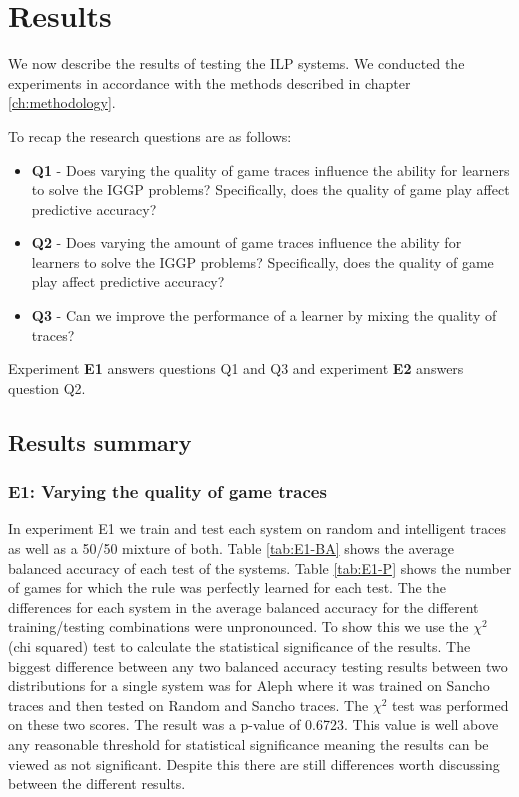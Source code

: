 \chapter{Results}\label{ch:results}
We now describe the results of testing the ILP systems. We conducted the experiments in accordance with the methods described in chapter \ref{ch:methodology}.

To recap the research questions are as follows:
\begin{itemize}
	\item \textbf{Q1} - Does varying the quality of game traces influence the ability for learners to solve the IGGP problems? Specifically, does the quality of game play affect predictive accuracy?
	\item \textbf{Q2} - Does varying the amount of game traces influence the ability for learners to solve the IGGP problems? Specifically, does the quality of game play affect predictive accuracy?
	\item \textbf{Q3} - Can we improve the performance of a learner by mixing the quality of traces?
\end{itemize}

Experiment \textbf{E1} answers questions Q1 and Q3 and experiment \textbf{E2} answers question Q2.

\section{Results summary}



\subsection{E1: Varying the quality of game traces}
In experiment E1 we train and test each system on random and intelligent traces as well as a 50/50 mixture of both. Table \ref{tab:E1-BA} shows the average balanced accuracy of each test of the systems. Table \ref{tab:E1-P} shows the number of games for which the rule was perfectly learned for each test. The the differences for each system in the average balanced accuracy for the different training/testing combinations were unpronounced. To show this we use the $\chi^2$ (chi squared) test to calculate the statistical significance of the results. The biggest difference between any two balanced accuracy testing results between two distributions for a single system was for Aleph where it was trained on Sancho traces and then tested on Random and Sancho traces. The $\chi^2$ test was performed on these two scores. The result was a p-value of 0.6723. This value is well above any reasonable threshold for statistical significance meaning the results can be viewed as not significant. Despite this there are still differences worth discussing between the different results.

